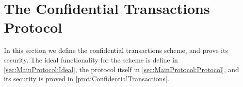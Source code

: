 
\newcommand{\init}{\mathsf{init}}
\newcommand{\mint}{\mathsf{mint}}
\newcommand{\transfer}{\mathsf{transfer}}
\newcommand{\audit}{\mathsf{audit}}
\newcommand{\rollover}{\mathsf{rollover}}
\newcommand{\withraw}{\mathsf{withraw}}
\newcommand{\history}{\mathsf{history}}
\newcommand{\balance}{\mathsf{avlBlance}}
\newcommand{\pendbalance}{\mathsf{pndBalance}}
\newcommand{\tcount}{\mathsf{pndCount}}
\newcommand{\gcount}{\mathsf{gCount}}


\newcommand{\historylog}{\mathsf{log}}
\newcommand{\sConfTran}{\mathsf{ConfTrans}}
\newcommand{\fConfTran}{\MathAlgX{\cF_\sConfTran}}
\newcommand{\pConfTran}{\MathAlgX{\Pi_\sConfTran}}


\newcommand{\Auditor}{\Ac}
\newcommand{\Chain}{{\MathAlgX{C}}}

\newcommand{\pcountCns}{p_{\mathsf{count}} }
\newcommand{\psizeCns}{p_{\mathsf{size}} }
\newcommand{\gcountCns}{g_{\mathsf{count}} }


\newcommand{\rEnc}{\hyperref[rel:Enc]{\cR_{\sf Enc}}}
\newcommand{\rEncDef}
{
	\sset{((\pk,\oA),(a,r))\colon \Enc_\pk(a;r)= \oA}
}

\newcommand{\rKeyGen}{\hyperref[rel:KeyGen]{\cR_{\sf KeyGen}}}
\newcommand{\rKeyGenDef}
{
	\sset{(\pk,w))\colon \KeyGen(w)= (\cdot,\pk)}
}




\newcommand{\Eqs}{{\sf Eq}}
\newcommand{\rEq}{\hyperref[rel:Eq]{\cR_\Eqs}}
\newcommand{\rEqDef}
{
	\set{((\pk_0,\pk_1,\oA_0,\oA_1),(a,r_0,r_1))\colon \forall i\in \zo \; \Enc_{\pk_i}(a;r_i)= \A_i}
}


\newcommand{\EqSks}{{\sf EqSk}}
\newcommand{\rEqSk}{\hyperref[rel:EqSk]{\cR_\EqSks}}
\newcommand{\rEqSkDef}
{
	\set{((\pk,\oA_0,\oA_1),w)\colon \KeyGen(w) = (\sk,\pk) \sland \Dec_\sk(\oA_0)= \Dec_\sk(\oA_1)  }
}




\newcommand{\RPs}{{\sf Rp}}
\newcommand{\rRp}{\hyperref[rel:Rp]{\cR_\RPs}}
\newcommand{\rRpDef}
{
	\sset{((\pk,\oA,\cS),(a,r))\colon \Enc_\pk(a;r)= \oA \sland a\in \cS}
}

\newcommand{\RpSkS}{{\sf RpSk}}
\newcommand{\rRpSk}{\hyperref[rel:RpSk]{\cR_\RpSkS}}
\newcommand{\rRpSkDef}
{
	\sset{((\pk,\oA,\cS),w)\colon \KeyGen(w) = (\sk,\pk) \sland  \Dec_\sk(\oA) \in \cS}
}





\section{The Confidential Transactions Protocol}\label{sec:MainProtocol}
In this section we define the confidential transactions scheme, and prove its security. The ideal functionality for the scheme is define in \cref{sec:MainProtocol:Ideal}, the protocol itself in \cref{sec:MainProtocol:Protocol}, and its security is proved in  \cref{prot:ConfidentialTransactions}.


